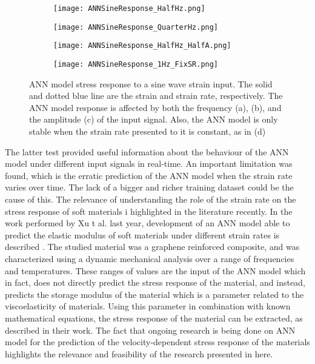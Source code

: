 \begin{figure}[htb!]
	\centering
    \begin{subfigure}[b]{0.49\textwidth}
        \centering
        \texttt{[image: ANNSineResponse\_HalfHz.png]}
        \caption{}
        \label{fig:ANNSineTesta}
    \end{subfigure}
    \begin{subfigure}[b]{0.49\textwidth}
        \centering
        \texttt{[image: ANNSineResponse\_QuarterHz.png]}
        \caption{}
        \label{fig:ANNSineTestb}
    \end{subfigure}
    \begin{subfigure}[b]{0.49\textwidth}
        \centering
        \texttt{[image: ANNSineResponse\_HalfHz\_HalfA.png]}
        \caption{}
        \label{fig:ANNSineTestc}
    \end{subfigure}
    \begin{subfigure}[b]{0.49\textwidth}
        \centering
        \texttt{[image: ANNSineResponse\_1Hz\_FixSR.png]}
        \caption{}
        \label{fig:ANNSineTestd}
    \end{subfigure}
    \caption{ANN model stress response to a sine wave strain input. The solid and dotted blue line are the strain and strain rate, respectively. The ANN model response is affected by both the frequency (a), (b), and the amplitude (c) of the input signal. Also, the ANN model is only stable when the strain rate presented to it is constant, as in (d)}
    \label{fig:ANNSineTest}
\end{figure}

The latter test provided useful information about the behaviour of the ANN model under different input signals in real-time. An important limitation was found, which is the erratic prediction of the ANN model when the strain rate varies over time. The lack of a bigger and richer training dataset could be the cause of this. The relevance of understanding the role of the strain rate on the stress response of soft materials i highlighted in the literature recently. In the work performed by Xu t al. last year, development of an ANN model able to predict the elastic modulus of soft materials under different strain rates is described \cite{xu2019artificial}. The studied material was a graphene reinforced composite, and was characterized using a dynamic mechanical analysis over a range of frequencies and temperatures. These ranges of values are the input of the ANN model which in fact, does not directly predict the stress response of the material, and instead, predicts the storage modulus of the material which is a parameter related to the viscoelasticity of materials. Using this parameter in combination with known mathematical equations, the stress response of the material can be extracted, as described in their work. The fact that ongoing research is being done on ANN model for the prediction of the velocity-dependent stress response of the materials highlights the relevance and feasibility of the research presented in here.

